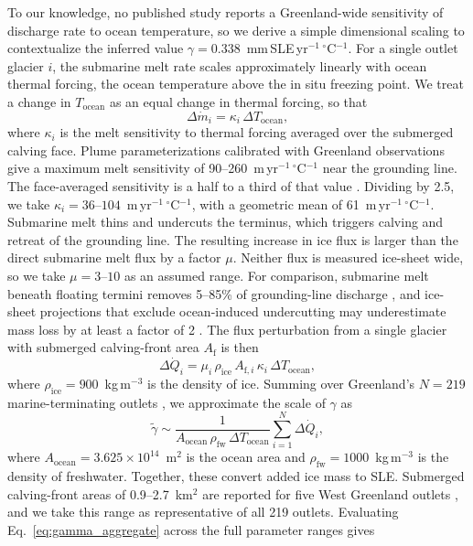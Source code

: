 \documentclass[draft,linenumbers]{agujournal2025}
\begin{document}
To our knowledge, no published study reports a Greenland-wide sensitivity of discharge rate to ocean temperature, so we derive a simple dimensional scaling to contextualize the inferred value $\gamma = 0.338$~mm\,SLE\,yr$^{-1}$\,$^\circ$C$^{-1}$. For a single outlet glacier $i$, the submarine melt rate scales approximately linearly with ocean thermal forcing, the ocean temperature above the in situ freezing point. We treat a change in $T_{\mathrm{ocean}}$ as an equal change in thermal forcing, so that
\begin{equation}
	\Delta \dot{m}_i = \kappa_i\,\Delta T_{\mathrm{ocean}},
	\label{eq:melt_rate}
\end{equation}
where $\kappa_i$ is the melt sensitivity to thermal forcing averaged over the submerged calving face. Plume parameterizations calibrated with Greenland observations \citep{Xu2013, Rignot2016, Slater2022} give a maximum melt sensitivity of 90--260~m\,yr$^{-1}$\,$^\circ$C$^{-1}$ near the grounding line. The face-averaged sensitivity is a half to a third of that value \citep{Wood2021}. Dividing by 2.5, we take $\kappa_i = 36$--$104$~m\,yr$^{-1}$\,$^\circ$C$^{-1}$, with a geometric mean of 61~m\,yr$^{-1}$\,$^\circ$C$^{-1}$. Submarine melt thins and undercuts the terminus, which triggers calving and retreat of the grounding line. The resulting increase in ice flux is larger than the direct submarine melt flux by a factor $\mu$. Neither flux is measured ice-sheet wide, so we take $\mu = 3$--$10$ as an assumed range. For comparison, submarine melt beneath floating termini removes 5--85\% of grounding-line discharge \citep{Enderlin2013}, and ice-sheet projections that exclude ocean-induced undercutting may underestimate mass loss by at least a factor of 2 \citep{Wood2021}. The flux perturbation from a single glacier with submerged calving-front area $A_{\mathrm{f}}$ is then
\begin{equation}
	\Delta \dot{Q}_i = \mu_i\,\rho_{\mathrm{ice}}\,A_{\mathrm{f},i}\,\kappa_i\,\Delta T_{\mathrm{ocean}},
	\label{eq:single_glacier_flux}
\end{equation}
where $\rho_{\mathrm{ice}} = 900$~kg\,m$^{-3}$ is the density of ice. Summing over Greenland's $N = 219$ marine-terminating outlets \citep{Mouginot2019}, we approximate the scale of $\gamma$ as
\begin{equation}
	\widetilde{\gamma} \sim \frac{1}{A_{\mathrm{ocean}}\,\rho_{\mathrm{fw}}\,\Delta T_{\mathrm{ocean}}}\sum_{i=1}^{N} \Delta\dot{Q}_i ,
	\label{eq:gamma_aggregate}
\end{equation}
where $A_{\mathrm{ocean}} = 3.625 \times 10^{14}$~m$^2$ is the ocean area and $\rho_{\mathrm{fw}} = 1000$~kg\,m$^{-3}$ is the density of freshwater. Together, these convert added ice mass to SLE. Submerged calving-front areas of 0.9--2.7~km$^2$ are reported for five West Greenland outlets \citep{Rignot2016}, and we take this range as representative of all 219 outlets. Evaluating Eq.~\ref{eq:gamma_aggregate} across the full parameter ranges gives
\end{document}
